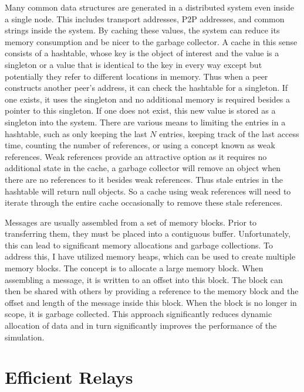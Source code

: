 Many common data structures are generated in a distributed system even inside a
single node.  This includes transport addresses, P2P addresses, and common
strings inside the system.  By caching these values, the system can reduce its
memory consumption and be nicer to the garbage collector.  A cache in this
sense consists of a hashtable, whose key is the object of interest and the
value is a singleton or a value that is identical to the key in every way
except but potentially they refer to different locations in memory.  Thus when
a peer constructs another peer's address, it can check the hashtable for a
singleton.  If one exists, it uses the singleton and no additional memory is
required besides a pointer to this singleton.  If one does not exist, this new
value is stored as a singleton into the system.  There are various means to
limiting the entries in a hashtable, such as only keeping the last $N$ entries,
keeping track of the last access time, counting the number of references, or
using a concept known as weak references.  Weak references provide an
attractive option as it requires no additional state in the cache, a garbage
collector will remove an object when there are no references to it besides weak
references.  Thus stale entries in the hashtable will return null objects.  So
a cache using weak references will need to iterate through the entire cache
occasionally to remove these stale references.

Messages are usually assembled from a set of memory blocks.  Prior to
transferring them, they must be placed into a contiguous buffer.
Unfortunately, this can lead to significant memory allocations and garbage
collections.  To address this, I have utilized memory heaps, which can be used
to create multiple memory blocks.  The concept is to allocate a large memory
block.  When assembling a message, it is written to an offset into this block.
The block can then be shared with others by providing a reference to the memory
block and the offset and length of the message inside this block.  When the
block is no longer in scope, it is garbage collected.  This approach
significantly reduces dynamic allocation of data and in turn significantly
improves the performance of the simulation.

\section{Efficient Relays}

